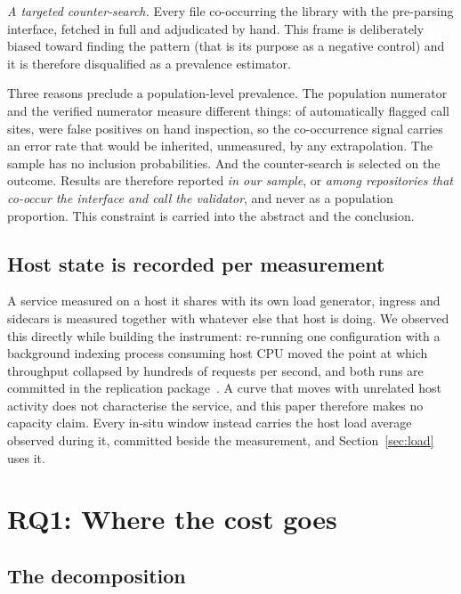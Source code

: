 \documentclass[preprint,12pt,authoryear]{elsarticle}
\begin{document}
\emph{A targeted counter-search.} Every file co-occurring the library with the
pre-parsing interface, fetched in full and adjudicated by hand. This frame is
deliberately biased toward finding the pattern (that is its purpose as a
negative control) and it is therefore disqualified as a prevalence estimator.

Three reasons preclude a population-level prevalence. The population numerator
and the verified numerator measure different things: of \AdjudicatedTotal{}
automatically flagged call sites, \AdjudicatedFalsePositive{} were false
positives on hand inspection, so the co-occurrence signal carries an error rate
that would be inherited, unmeasured, by any extrapolation. The sample has no
inclusion probabilities. And the counter-search is selected on the outcome.
Results are therefore reported \emph{in our sample}, or \emph{among repositories
that co-occur the interface and call the validator}, and never as a population
proportion. This constraint is carried into the abstract and the conclusion.

\subsection{Host state is recorded per measurement}\label{sec:hoststate}

A service measured on a host it shares with its own load generator, ingress and
sidecars is measured together with whatever else that host is doing. We observed
this directly while building the instrument: re-running one configuration with a
background indexing process consuming host CPU moved the point at which
throughput collapsed by hundreds of requests per second, and both runs are
committed in the replication package~\citep{artifact2026}. A curve that moves
with unrelated host activity does not characterise the service, and this paper
therefore makes no capacity claim. Every in-situ window instead carries the host
load average observed during it, committed beside the measurement, and
Section~\ref{sec:load} uses it.

\section{RQ1: Where the cost goes}\label{sec:rq1}

\subsection{The decomposition}
\end{document}
